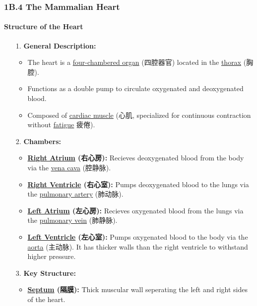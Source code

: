 
\subsubsection{1B.4 The Mammalian Heart}
\paragraph{Structure of the Heart}
\begin{itemize}
    \item[1.] \textbf{General Description:}
    \begin{itemize}
        \item The heart is a \underline{four-chambered organ} (四腔器官) located in the \underline{thorax} (胸腔).
        \item Functions as a double pump to circulate oxygenated and deoxygenated blood.
        \item Composed of \underline{cardiac muscle} (心肌, specialized for continuous contraction without \underline{fatigue}
        疲倦).
    \end{itemize}
    \item[2.] \textbf{Chambers:}
    \begin{itemize}
        \item \textbf{\underline{Right Atrium} (右心房):} Recieves deoxygenated blood from the body via the \underline{vena cava}
        (腔静脉).
        \item \textbf{\underline{Right Ventricle} (右心室):} Pumps deoxygenated blood to the lungs via the \underline{pulmonary
        artery} (肺动脉).
        \item \textbf{\underline{Left Atrium} (左心房):} Recieves oxygenated blood from the lungs via the \underline{pulmonary
        vein} (肺静脉).
        \item \textbf{\underline{Left Ventricle} (左心室):} Pumps oxygenated blood to the body via the \underline{aorta} (主动脉).
        It has thicker walls than the right ventricle to withstand higher pressure.
    \end{itemize}
    \item[3.] \textbf{Key Structure:}
    \begin{itemize}
        \item \textbf{\underline{Septum} (隔膜):} Thick muscular wall seperating the left and right sides of the heart.

\end{itemize}
\end{itemize}
